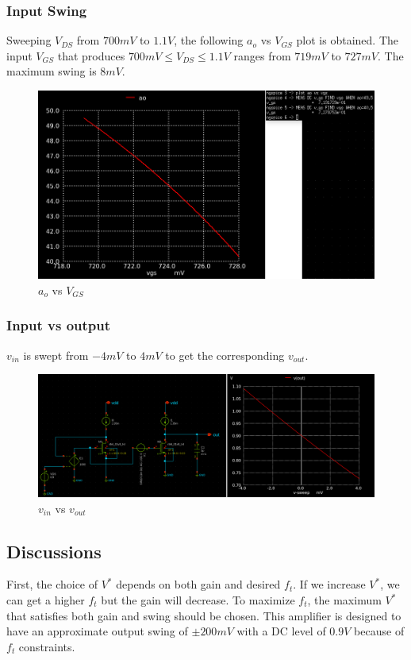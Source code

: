 \documentclass[conference]{IEEEtran}
\begin{document}
\subsubsection{Input Swing}
Sweeping $V_{DS}$ from $700mV$ to $1.1V$, the following $a_o$ vs $V_{GS}$ plot is obtained. 
The input $V_{GS}$ that produces $700mV \leq V_{DS} \leq 1.1V$ ranges from $719mV$ to $727mV$. 
The maximum swing is $8mV$. 
\begin{figure}[H]
	\centering 
	\includegraphics[width=\columnwidth]{gain-fumax-vgs.png}
	\caption{$a_o$ vs $V_{GS}$}
	\label{ao-fumax-vgs}	
\end{figure}
\subsubsection{Input vs output}
$v_{in}$ is swept from $-4mV$ to $4mV$ to get the corresponding $v_{out}$. 
\begin{figure}[H]
	\centering 
	\includegraphics[width=\columnwidth]{vinvout.png}
	\caption{$v_{in}$ vs $v_{out}$}
	\label{vinvout-2}	
\end{figure}

\subsection{Discussions}
First, the choice of $V^*$ depends on both gain and desired $f_t$. If we increase $V^*$, we 
can get a higher $f_t$ but the gain will decrease. To maximize $f_t$, the maximum $V^*$ that 
satisfies both gain and swing should be chosen. This amplifier is designed to have an approximate output swing of $\pm 200mV$ with a DC level of $0.9V$ because of $f_t$ constraints. 
\end{document}
